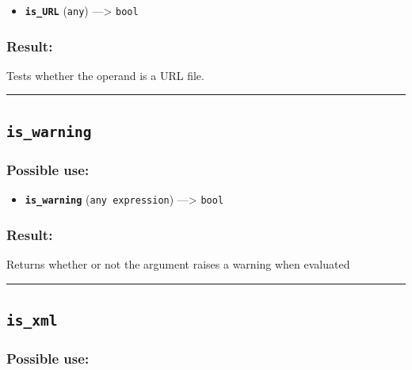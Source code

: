 \documentclass[]{book}
\providecommand{\tightlist}{%
  \setlength{\itemsep}{0pt}\setlength{\parskip}{0pt}}
\theoremstyle{definition}
\theoremstyle{definition}
\theoremstyle{definition}
\theoremstyle{remark}
\begin{document}
\begin{itemize}
\tightlist
\item
  \textbf{\texttt{is\_URL}} (\texttt{any}) ---\textgreater{}
  \texttt{bool}
\end{itemize}

\subsubsection{Result:}\label{result-297}

Tests whether the operand is a URL file.

\begin{center}\rule{0.5\linewidth}{\linethickness}\end{center}

\subsection{\texorpdfstring{\texttt{is\_warning}}{is\_warning}}\label{is_warning}

\subsubsection{Possible use:}\label{possible-use-308}

\begin{itemize}
\tightlist
\item
  \textbf{\texttt{is\_warning}} (\texttt{any\ expression})
  ---\textgreater{} \texttt{bool}
\end{itemize}

\subsubsection{Result:}\label{result-298}

Returns whether or not the argument raises a warning when evaluated

\begin{center}\rule{0.5\linewidth}{\linethickness}\end{center}

\subsection{\texorpdfstring{\texttt{is\_xml}}{is\_xml}}\label{is_xml}

\subsubsection{Possible use:}\label{possible-use-309}
\end{document}
